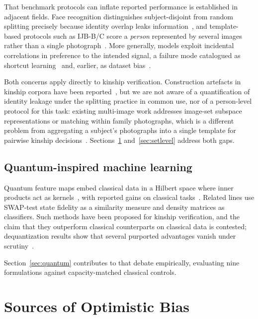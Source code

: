 \documentclass[journal,12pt]{IEEEtran}
\begin{document}
That benchmark protocols can inflate reported performance is established in
adjacent fields. Face recognition distinguishes subject-disjoint from random
splitting precisely because identity overlap leaks
information~\cite{TODO_subject_disjoint}, and template-based protocols such as
IJB-B/C score a \emph{person} represented by several images rather than a
single photograph~\cite{whitelam2017ijbb}. More generally, models exploit
incidental correlations in preference to the intended signal, a failure mode
catalogued as shortcut learning~\cite{geirhos2020shortcut} and, earlier, as
dataset bias~\cite{torralba2011unbiased}.

Both concerns apply directly to kinship verification. Construction artefacts in
kinship corpora have been reported~\cite{TODO_samephoto}, but we are not aware
of a quantification of identity leakage under the splitting practice in common
use, nor of a person-level protocol for this task: existing multi-image work
addresses image-set subspace representations or matching within family
photographs, which is a different problem from aggregating a subject's
photographs into a single template for pairwise kinship
decisions~\cite{TODO_imageset_kinship}. Sections~\ref{sec:bias}
and~\ref{sec:setlevel} address both gaps.

\subsection{Quantum-inspired machine learning}

Quantum feature maps embed classical data in a Hilbert space where inner
products act as kernels~\cite{schuld2019quantum}, with reported gains on
classical tasks~\cite{havlicek2019supervised}. Related lines use SWAP-test
state fidelity as a similarity measure and density matrices as classifiers.
Such methods have been proposed for kinship verification, and the claim that
they outperform classical counterparts on classical data is contested;
dequantization results show that several purported advantages
vanish under scrutiny~\cite{TODO_dequantization}.

Section~\ref{sec:quantum} contributes to that debate empirically, evaluating
nine formulations against capacity-matched classical controls.

\section{Sources of Optimistic Bias}
\label{sec:bias}
\end{document}
